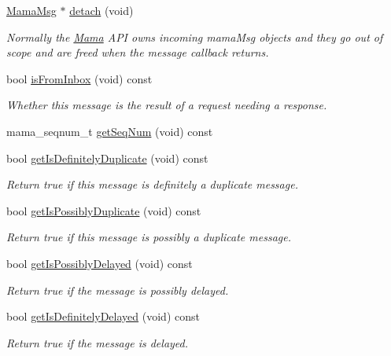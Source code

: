 \begin{DoxyCompactItemize}
\hyperlink{classWombat_1_1MamaMsg}{MamaMsg} $\ast$ \hyperlink{classWombat_1_1MamaMsg_a31dfd297630ab77abc3d8474c9a432c1}{detach} (void)
\begin{DoxyCompactList}\small\item\em Normally the \hyperlink{classWombat_1_1Mama}{Mama} API owns incoming mamaMsg objects and they go out of scope and are freed when the message callback returns. \item\end{DoxyCompactList}\item 
bool \hyperlink{classWombat_1_1MamaMsg_a3383cf94e958375db86531667e5c32c9}{isFromInbox} (void) const 
\begin{DoxyCompactList}\small\item\em Whether this message is the result of a request needing a response. \item\end{DoxyCompactList}\item 
mama\_\-seqnum\_\-t \hyperlink{classWombat_1_1MamaMsg_a8942daee02db325054cffb096a9a6e96}{getSeqNum} (void) const 
\item 
bool \hyperlink{classWombat_1_1MamaMsg_aa29712e33dec9598f58d8b47d954a688}{getIsDefinitelyDuplicate} (void) const 
\begin{DoxyCompactList}\small\item\em Return true if this message is definitely a duplicate message. \item\end{DoxyCompactList}\item 
bool \hyperlink{classWombat_1_1MamaMsg_a3ac6ff5481827b2be803a43f1e5675e6}{getIsPossiblyDuplicate} (void) const 
\begin{DoxyCompactList}\small\item\em Return true if this message is possibly a duplicate message. \item\end{DoxyCompactList}\item 
bool \hyperlink{classWombat_1_1MamaMsg_ad404a729cc7d7c213fd52e0235689d9e}{getIsPossiblyDelayed} (void) const 
\begin{DoxyCompactList}\small\item\em Return true if the message is possibly delayed. \item\end{DoxyCompactList}\item 
bool \hyperlink{classWombat_1_1MamaMsg_a8fe32c62e0c88639c9e022337d4c7228}{getIsDefinitelyDelayed} (void) const 
\begin{DoxyCompactList}\small\item\em Return true if the message is delayed. \item\end{DoxyCompactList}\item 

\end{DoxyCompactItemize}
